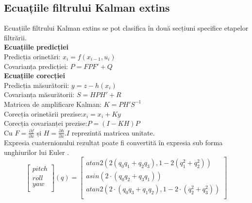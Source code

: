 \subsection{Ecuațiile filtrului Kalman extins}
\-\hspace{1cm}Ecuațiile filtrului Kalman extins se pot clasifica în două secțiuni specifice etapelor filtrării.\\
\textbf{Ecuațiile predicției}\\
Predicția orinetări:   $x_i=f(x_{i-1},u_i)$\\
Covarianța predicției: $P=FPF'+Q$\\
\textbf{Ecuațiile corecției}\\
Predicția măsurătorii:  $y=z-h(x_i)$\\
Covarianța măsurătorii:  $S=HPH'+R$\\
Matricea de amplificare Kalman: $K=PH'S^{-1}$\\
Corecția orinetării prezise:$x_i=x_i+Ky$\\
Corecția covarianței prezise:$P=(I-KH)P$\\
Cu $F=\frac{\partial f}{\partial x}$ și $H=\frac{\partial h}{\partial x}$.$I$ reprezintă matricea unitate.\\

\-\hspace{1cm}Expresia cuaternionului rezultat poate fi convertită în expresia sub forma unghiurilor lui Euler \cite{quatro}.
\begin{equation}
\begin{bmatrix}
pitch \\  
roll \\ 
yaw \\
\end{bmatrix}
(q)=
\begin{bmatrix}
atan2(2(q_0q_1+q_2q_3),1-2(q_1^2+q_2^2)) \\  
asin(2\cdot(q_0q_2+q_3q_1))\\ 
atan2(2\cdot(q_0q_3+q_1q_2),1-2\cdot(q_2^2+q_3^2))\\
\end{bmatrix}
\end{equation}

